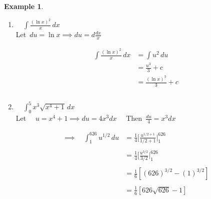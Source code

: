 \documentclass[11pt,a4paper]{article}
\theoremstyle{definition}
\newtheorem{example}[thm]{Example}
\begin{document}
\begin{example}
\begin{enumerate}
\item $\quad \displaystyle{\int \frac{\left(\ln x\right)^2}{x}\,dx}$\\

Let $\, du = \ln x \implies du = d\frac{dx}{x}$


\begin{align*}
\int \frac{\left(\ln x\right)^2}{x}\,dx & = \int u^2\,du \\
& = \frac{u^3}{3} + c\\
& = \frac{\left(\ln x \right)^3}{3} + c\\\\
\end{align*}






\item $\quad \displaystyle{\int^5_0 x^3\sqrt{x^4 + 1}\,dx}$\\

Let $\quad  u = x^4 + 1\implies du = 4x^3dx\quad $ Then $\, \frac{du}{4} = x^3dx$


\begin{figure}[H]
\centering
{}
\end{figure}


















\begin{align*}
\implies\quad  \int^{626}_1 u^{1/2}\,du & = \frac{1}{4}\Bigg[\frac{u^{1/2 + 1}}{1/2 + 1}\Bigg|^{626}_1\\\\
& = \frac{1}{4}\Bigg[\frac{u^{3/2}}{3/2}\Bigg|^{626}_1\\\\
& = \frac{1}{6}\left[\left(626\right)^{3/2} - \left(1\right)^{3/2}\right]\\\\
& = \frac{1}{6}\left[626\sqrt{626}  - 1\right]\\\\
\end{align*}
\end{enumerate}
\end{example}
\end{document}
